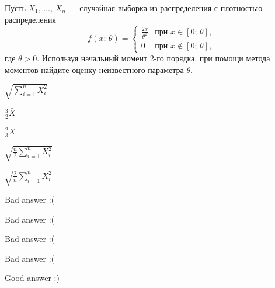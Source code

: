 
\begin{question}
Пусть \(X_1, \, \ldots, \, X_n\) --- случайная выборка из распределения
с плотностью распределения \[
    f(x; \, \theta) = \begin{cases}
                          \frac{2x}{\theta^2} & \text{при } x \in [0;\,\theta], \\
                          0 & \text{при } x \not\in [0;\,\theta],
                      \end{cases}
\] где \(\theta > 0\). Используя начальный момент 2-го порядка, при
помощи метода моментов найдите оценку неизвестного параметра \(\theta\).
\begin{answerlist}
  \item \(\sqrt{\sum_{i=1}^{n}X_i^2}\)
  \item \(\tfrac{3}{2}\bar{X}\)
  \item \(\tfrac{2}{3}\bar{X}\)
  \item \(\sqrt{\tfrac{n}{2}\sum_{i=1}^{n}X_i^2}\)
  \item \(\sqrt{\tfrac{2}{n}\sum_{i=1}^{n}X_i^2}\)
\end{answerlist}
\end{question}

\begin{solution}
\begin{answerlist}
  \item Bad answer :(
  \item Bad answer :(
  \item Bad answer :(
  \item Bad answer :(
  \item Good answer :)
\end{answerlist}
\end{solution}

